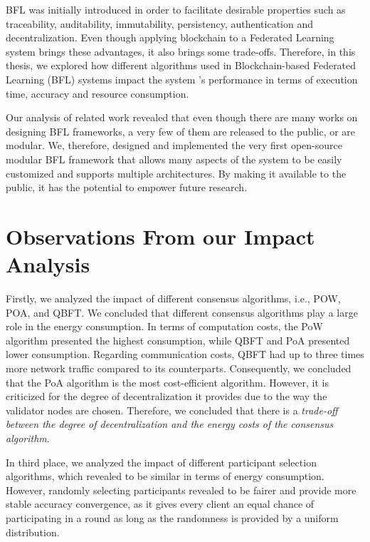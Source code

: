 BFL was initially introduced in order to facilitate desirable properties such as traceability, auditability, immutability, persistency, authentication and decentralization. Even though applying blockchain to a Federated Learning system brings these advantages, it also brings some trade-offs. Therefore, in this thesis, we explored how different algorithms used in Blockchain-based Federated Learning (BFL) systems impact the system 's performance in terms of execution time, accuracy and resource consumption. 

Our analysis of related work revealed that even though there are many works on designing BFL frameworks, a very few of them are
released to the public, or are modular. We, therefore, designed and implemented the very first open-source modular BFL framework that allows many aspects of the system to be easily customized and supports multiple architectures. By making it available to the public, it has the potential to empower future research.

\section{Observations From our Impact Analysis}\label{conclusions:evaluation}



Firstly, we analyzed the impact of different consensus algorithms, i.e., POW, POA, and QBFT. We concluded that different consensus algorithms play a large role in the energy consumption. In terms of computation costs, the PoW algorithm presented the highest consumption, while QBFT and PoA presented lower consumption. Regarding communication costs, QBFT had up to three times more network traffic compared to its counterparts. Consequently, we concluded that the PoA algorithm is the most cost-efficient algorithm. However, it is criticized for the degree of decentralization it provides due to the way the validator nodes are chosen. Therefore, we concluded that there is a \textit{trade-off between the degree of decentralization and the energy costs of the consensus algorithm}.

In third place, we analyzed the impact of different participant selection algorithms, which revealed to be similar in terms of energy consumption. However, randomly selecting participants revealed to be fairer and provide more stable accuracy convergence, as it gives every client an equal chance of participating in a round as long as the randomness is provided by a uniform distribution.


